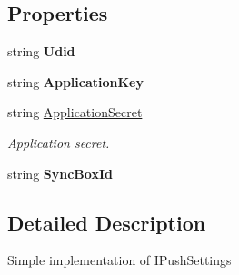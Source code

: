 \subsection*{Properties}
\begin{DoxyCompactItemize}
\item 
\hypertarget{class_cloud_api_public_1_1_push_notification_1_1_push_settings_abd2726070df1f88d325a22a00099147a}{string {\bfseries Udid}}\label{class_cloud_api_public_1_1_push_notification_1_1_push_settings_abd2726070df1f88d325a22a00099147a}

\item 
\hypertarget{class_cloud_api_public_1_1_push_notification_1_1_push_settings_ab9ed3bf41aefce7c7d292f6528c761ec}{string {\bfseries Application\-Key}}\label{class_cloud_api_public_1_1_push_notification_1_1_push_settings_ab9ed3bf41aefce7c7d292f6528c761ec}

\item 
string \hyperlink{class_cloud_api_public_1_1_push_notification_1_1_push_settings_a2984eb5cc9475a60bf5bdb9819d485ca}{Application\-Secret}
\begin{DoxyCompactList}\small\item\em Application secret. \end{DoxyCompactList}\item 
\hypertarget{class_cloud_api_public_1_1_push_notification_1_1_push_settings_a7df4645b7dd7993e4fc28255dd3d30b4}{string {\bfseries Sync\-Box\-Id}}\label{class_cloud_api_public_1_1_push_notification_1_1_push_settings_a7df4645b7dd7993e4fc28255dd3d30b4}

\end{DoxyCompactItemize}


\subsection{Detailed Description}
Simple implementation of I\-Push\-Settings 



